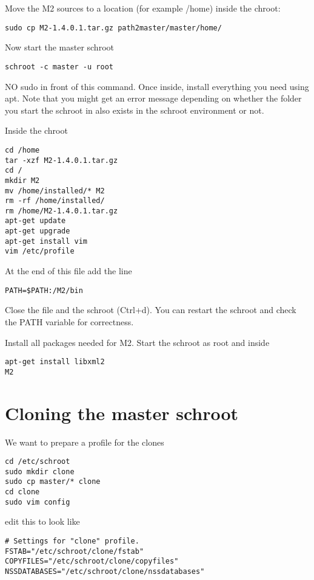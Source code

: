 \documentclass[a4paper]{article}
\begin{document}
Move the M2 sources to a location (for example /home) inside the chroot:

\begin{verbatim}
sudo cp M2-1.4.0.1.tar.gz path2master/master/home/
\end{verbatim}

Now start the master schroot

\begin{verbatim}
schroot -c master -u root
\end{verbatim}

NO sudo in front of this command. Once inside, install everything you need using apt.
Note that you might get an error message depending on whether the folder you start the schroot in also exists in the schroot environment or not.

Inside the chroot

\begin{verbatim}
cd /home
tar -xzf M2-1.4.0.1.tar.gz
cd /
mkdir M2
mv /home/installed/* M2
rm -rf /home/installed/
rm /home/M2-1.4.0.1.tar.gz
apt-get update
apt-get upgrade
apt-get install vim
vim /etc/profile
\end{verbatim}

At the end of this file add the line

\begin{verbatim}
PATH=$PATH:/M2/bin
\end{verbatim}

Close the file and the schroot (Ctrl+d). You can restart the schroot and check the PATH variable for correctness.

Install all packages needed for M2. Start the schroot as root and inside

\begin{verbatim}
apt-get install libxml2
M2
\end{verbatim}

\section{Cloning the master schroot}

We want to prepare a profile for the clones

\begin{verbatim}
cd /etc/schroot
sudo mkdir clone
sudo cp master/* clone
cd clone
sudo vim config
\end{verbatim}

edit this to look like

\begin{verbatim}
# Settings for "clone" profile.
FSTAB="/etc/schroot/clone/fstab"
COPYFILES="/etc/schroot/clone/copyfiles"
NSSDATABASES="/etc/schroot/clone/nssdatabases"
\end{verbatim}
\end{document}

